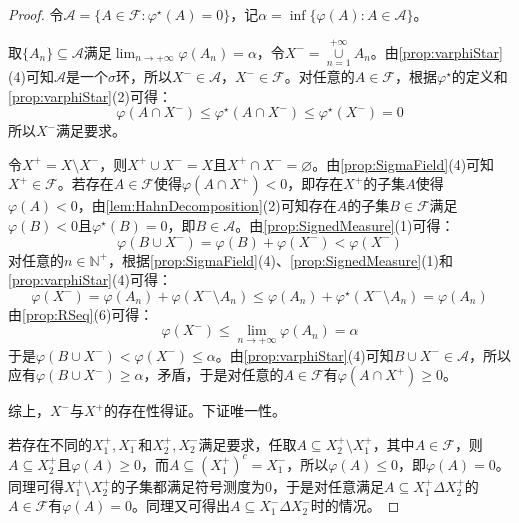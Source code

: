 \begin{proof}
	令$\mathscr{A}=\{A\in\mathscr{F}:\varphi^{\star}(A)=0\}$，记$\alpha=\inf\{\varphi(A):A\in\mathscr{A}\}$。\par
	取$\{A_n\}\subseteq\mathscr{A}$满足$\lim_{n\to+\infty}\limits\varphi(A_n)=\alpha$，令$X^-=\underset{n=1}{\overset{+\infty}{\cup}}A_n$。由\cref{prop:varphiStar}(4)可知$\mathscr{A}$是一个$\sigma$环，所以$X^-\in\mathscr{A}$，$X^-\in\mathscr{F}$。对任意的$A\in\mathscr{F}$，根据$\varphi^{\star}$的定义和\cref{prop:varphiStar}(2)可得：
	\begin{equation*}
		\varphi(A\cap X^-)\leqslant\varphi^{\star}(A\cap X^-)\leqslant\varphi^{\star}(X^-)=0
	\end{equation*}
	所以$X^-$满足要求。\par
	令$X^+=X\setminus X^-$，则$X^+\cup X^-=X$且$X^+\cap X^-=\varnothing$。由\cref{prop:SigmaField}(4)可知$X^+\in\mathscr{F}$。若存在$A\in\mathscr{F}$使得$\varphi(A\cap X^+)<0$，即存在$X^+$的子集$A$使得$\varphi(A)<0$，由\cref{lem:HahnDecomposition}(2)可知存在$A$的子集$B\in\mathscr{F}$满足$\varphi(B)<0$且$\varphi^{\star}(B)=0$，即$B\in\mathscr{A}$。由\cref{prop:SignedMeasure}(1)可得：
	\begin{equation*}
		\varphi(B\cup X^-)=\varphi(B)+\varphi(X^-)<\varphi(X^-)
	\end{equation*}
	对任意的$n\in\mathbb{N}^+$，根据\cref{prop:SigmaField}(4)、\cref{prop:SignedMeasure}(1)和\cref{prop:varphiStar}(4)可得：
	\begin{equation*}
		\varphi(X^-)=\varphi(A_n)+\varphi(X^-\setminus A_n)\leqslant\varphi(A_n)+\varphi^{\star}(X^-\setminus A_n)=\varphi(A_n)
	\end{equation*}
	由\cref{prop:RSeq}(6)可得：
	\begin{equation*}
		\varphi(X^-)\leqslant\lim_{n\to+\infty}\varphi(A_n)=\alpha
	\end{equation*}
	于是$\varphi(B\cup X^-)<\varphi(X^-)\leqslant\alpha$。由\cref{prop:varphiStar}(4)可知$B\cup X^-\in\mathscr{A}$，所以应有$\varphi(B\cup X^-)\geqslant\alpha$，矛盾，于是对任意的$A\in\mathscr{F}$有$\varphi(A\cap X^+)\geqslant0$。\par
	综上，$X^-$与$X^+$的存在性得证。下证唯一性。\par
	若存在不同的$X_1^+,X_1^-$和$X_2^+,X_2^-$满足要求，任取$A\subseteq X_2^+\setminus X_1^+$，其中$A\in\mathscr{F}$，则$A\subseteq X_2^+$且$\varphi(A)\geqslant0$，而$A\subseteq (X_1^+)^c=X_1^-$，所以$\varphi(A)\leqslant0$，即$\varphi(A)=0$。同理可得$X_1^+\setminus X_2^+$的子集都满足符号测度为$0$，于是对任意满足$A\subseteq X_1^+\Delta X_2^+$的$A\in\mathscr{F}$有$\varphi(A)=0$。同理又可得出$A\subseteq X_1^-\Delta X_2^-$时的情况。
\end{proof}
